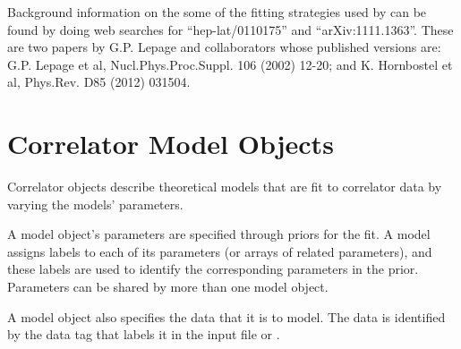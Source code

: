 \documentclass[letterpaper,10pt,english]{sphinxmanual}
\begin{document}
Background information on the some of the fitting strategies used by
{\hyperref[corrfitter:corrfitter.CorrFitter]{}} can be found by doing web searches for ``hep-lat/0110175'' and
``arXiv:1111.1363''. These are two papers by G.P. Lepage and collaborators
whose published versions are: G.P. Lepage et al, Nucl.Phys.Proc.Suppl.
106 (2002) 12-20; and K. Hornbostel et al, Phys.Rev. D85 (2012) 031504.


\section{Correlator Model Objects}
\label{corrfitter:correlator-model-objects}
Correlator objects describe theoretical models that are fit to
correlator data by varying the models' parameters.

A model object's parameters are specified through priors for the fit. A
model assigns labels to each of its parameters (or arrays of related
parameters), and these labels are used to identify the corresponding
parameters in the prior. Parameters can be shared by more than one model
object.

A model object also specifies the data that it is to model. The data is
identified by the data tag that labels it in the input file or .
\end{document}

